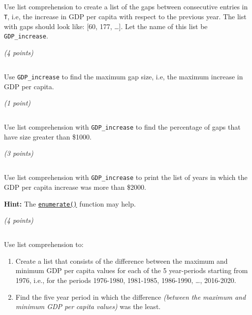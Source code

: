 \documentclass[
  letterpaper,
  DIV=11,
  numbers=noendperiod]{scrreprt}
\begin{document}
\hypertarget{section-40}{%
\subsection{}\label{section-40}}

Use list comprehension to create a list of the gaps between consecutive
entries in \texttt{T}, i.e, the increase in GDP per capita with respect
to the previous year. The list with gaps should look like: {[}60, 177,
\ldots{]}. Let the name of this list be \texttt{GDP\_increase}.

\emph{(4 points)}

\hypertarget{section-41}{%
\subsection{}\label{section-41}}

Use \texttt{GDP\_increase} to find the maximum gap size, i.e, the
maximum increase in GDP per capita.

\emph{(1 point)}

\hypertarget{section-42}{%
\subsection{}\label{section-42}}

Use list comprehension with \texttt{GDP\_increase} to find the
percentage of gaps that have size greater than \$1000.

\emph{(3 points)}

\hypertarget{section-43}{%
\subsection{}\label{section-43}}

Use list comprehension with \texttt{GDP\_increase} to print the list of
years in which the GDP per capita increase was more than \$2000.

\textbf{Hint:} The
\href{https://docs.python.org/3/library/functions.html\#enumerate}{\texttt{enumerate()}}
function may help.

\emph{(4 points)}

\hypertarget{section-44}{%
\subsection{}\label{section-44}}

Use list comprehension to:

\begin{enumerate}
\def\labelenumi{\arabic{enumi}.}
\item
  Create a list that consists of the difference between the maximum and
  minimum GDP per capita values for each of the 5 year-periods starting
  from 1976, i.e., for the periods 1976-1980, 1981-1985, 1986-1990,
  \ldots, 2016-2020.
\item
  Find the five year period in which the difference \emph{(between the
  maximum and minimum GDP per capita values)} was the least.
\end{enumerate}
\end{document}
